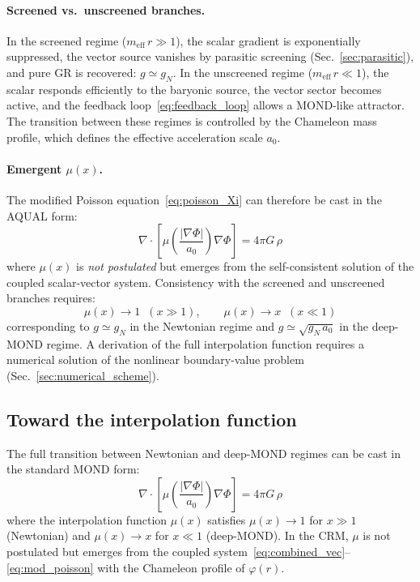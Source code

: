 \documentclass[aps,prd,twocolumn,superscriptaddress,nofootinbib]{revtex4-2}
\begin{document}
\paragraph{Screened vs.\ unscreened branches.}
In the screened regime ($m_{\mathrm{eff}}\,r \gg 1$), the scalar gradient is exponentially suppressed, the vector source vanishes by parasitic screening (Sec.~\ref{sec:parasitic}), and pure GR is recovered: $g \simeq g_N$. In the unscreened regime ($m_{\mathrm{eff}}\,r \ll 1$), the scalar responds efficiently to the baryonic source, the vector sector becomes active, and the feedback loop~\eqref{eq:feedback_loop} allows a MOND-like attractor. The transition between these regimes is controlled by the Chameleon mass profile, which defines the effective acceleration scale $a_0$.

\paragraph{Emergent $\mu(x)$.}
The modified Poisson equation~\eqref{eq:poisson_Xi} can therefore be cast in the AQUAL form:
\begin{equation}
\nabla\!\cdot\!\left[\mu\!\left(\frac{|\nabla\Phi|}{a_0}\right)\nabla\Phi\right] = 4\pi G\,\rho
\label{eq:aqual_emergent}
\end{equation}
where $\mu(x)$ is \textit{not postulated} but emerges from the self-consistent solution of the coupled scalar-vector system. Consistency with the screened and unscreened branches requires:
\begin{equation}
\mu(x) \to 1 \;\;(x \gg 1), \qquad \mu(x) \to x \;\;(x \ll 1)
\label{eq:mu_limits}
\end{equation}
corresponding to $g \simeq g_N$ in the Newtonian regime and $g \simeq \sqrt{g_N\,a_0}$ in the deep-MOND regime. A derivation of the full interpolation function requires a numerical solution of the nonlinear boundary-value problem (Sec.~\ref{sec:numerical_scheme}).

\subsection{Toward the interpolation function}
\label{sec:interpolation}

The full transition between Newtonian and deep-MOND regimes can be cast in the standard MOND form:
\begin{equation}
\nabla\cdot\!\left[\mu\!\left(\frac{|\nabla\Phi|}{a_0}\right)\nabla\Phi\right] = 4\pi G\,\rho
\label{eq:mond_form}
\end{equation}
where the interpolation function $\mu(x)$ satisfies $\mu(x) \to 1$ for $x \gg 1$ (Newtonian) and $\mu(x) \to x$ for $x \ll 1$ (deep-MOND). In the CRM, $\mu$ is not postulated but emerges from the coupled system~\eqref{eq:combined_vec}--\eqref{eq:mod_poisson} with the Chameleon profile of $\varphi(r)$.
\end{document}
